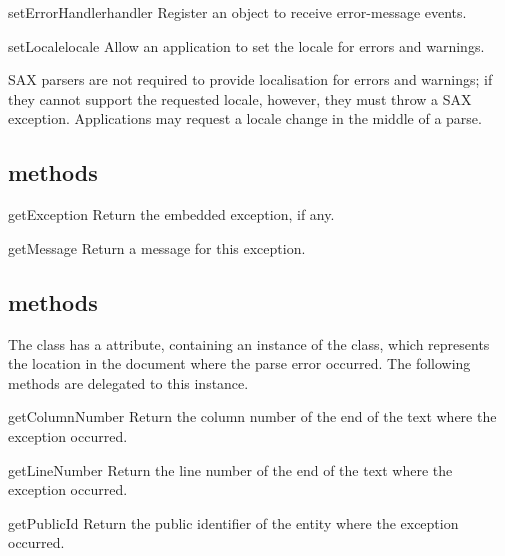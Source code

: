 \documentclass{howto}
\begin{document}
\begin{methoddesc}{setErrorHandler}{handler}
Register an object to receive error-message events.
\end{methoddesc}

\begin{methoddesc}{setLocale}{locale}
Allow an application to set the locale for errors and warnings. 
   
        SAX parsers are not required to provide localisation for errors
        and warnings; if they cannot support the requested locale,
        however, they must throw a SAX exception. Applications may
        request a locale change in the middle of a parse.
\end{methoddesc}

\subsection{ methods}

\begin{methoddesc}{getException}{}
Return the embedded exception, if any.
\end{methoddesc}

\begin{methoddesc}{getMessage}{}
Return a message for this exception.
\end{methoddesc}

\subsection{ methods}

The  class has a 
attribute, containing an instance of the  class, which
represents the location in the document where the parse error
occurred.  The following methods are delegated to this instance.

\begin{methoddesc}{getColumnNumber}{}
Return the column number of the end of the text where the exception
	occurred.
\end{methoddesc}

\begin{methoddesc}{getLineNumber}{}
Return the line number of the end of the text where the exception occurred.
\end{methoddesc}

\begin{methoddesc}{getPublicId}{}
Return the public identifier of the entity where the exception occurred.
\end{methoddesc}
\end{document}
